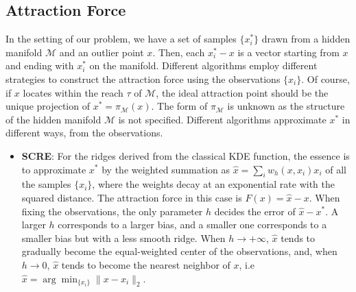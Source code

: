 \documentclass[aos,preprint]{imsart}
\theoremstyle{remark}
\begin{document}
\begin{appendix}
\subsection{Attraction Force}
In the setting of our problem, we have a set of samples $\{x_i^*\}$ drawn from a hidden manifold $\mathcal M$ and an outlier point ${x}$. Then, each $x_i^*-{x}$ is a vector starting from ${x}$ and ending with $x_i^*$ on the manifold. Different algorithms employ different strategies to construct the attraction force using the observations $\{x_i\}$. Of course, if ${x}$ locates within the reach $\tau$ of $\mathcal M$, the ideal attraction point should be the unique projection of $x^*=\pi_{\mathcal M}( x)$. The form of $\pi_{\mathcal M}$ is unknown as the structure of the hidden manifold $\mathcal M$ is not specified. Different algorithms approximate $x^*$ in different ways, from the observations.
\begin{itemize}
\item{\bf SCRE}: For the ridges derived from the classical KDE function, the essence is to approximate $x^*$ by the weighted summation as $\hat{x} = \sum_i w_h({x}, x_i)x_i$ of all the samples $\{x_i\}$, where the weights decay at an exponential rate with the squared distance. The attraction force in this case is $F(x) = \hat{x}-x$. When fixing the observations, the only parameter $h$ decides the error of $\hat{x}-{x}^*$. A larger $h$ corresponds to a larger bias, and a smaller one corresponds to a smaller bias but with a less smooth ridge. When $h\rightarrow +\infty$, $\hat{x}$ tends to gradually become the equal-weighted center of the observations, and, when $h\rightarrow 0$, $\hat{x}$ tends to become the nearest neighbor of $x$, i.e $\hat{x} = \arg\min_{\{x_i\}} \|x-x_i\|_2$.


\end{itemize}
\end{appendix}
\end{document}

